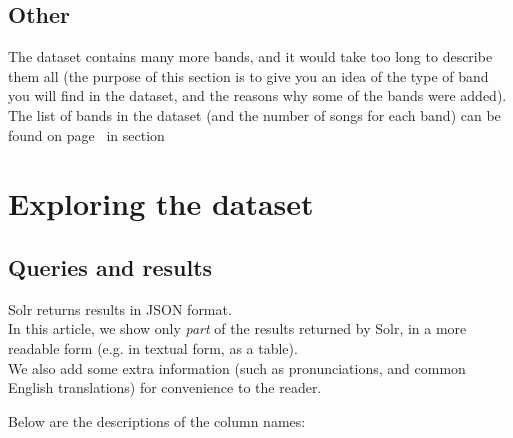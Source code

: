 \bigskip




\subsection{Other}

The dataset contains many more bands, and it would take too long to describe them all (the purpose of this section is to give you an idea of the type of band you will find in the dataset, and the reasons why some of the bands were added). \\

The list of bands in the dataset (and the number of songs for each band) can be found on page~\pageref*{query-list-of-bands} in section~\emph{} \\






\newpage
\section{Exploring the dataset} \label{exploring-dataset}

\subsection{Queries and results}

Solr returns results in JSON format. \\

In this article, we show only \emph{part} of the results returned by Solr, in a more readable form (e.g. in textual form, as a table). \\

We also add some extra information (such as pronunciations, and common English translations) for convenience to the reader. \\

\bigskip

Below are the descriptions of the column names:

